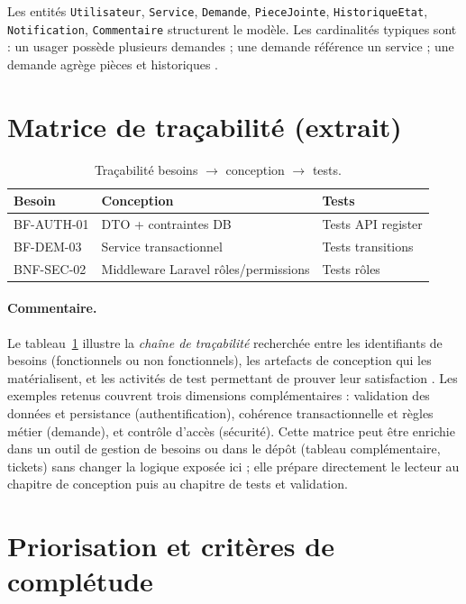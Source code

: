 Les entités \texttt{Utilisateur}, \texttt{Service}, \texttt{Demande}, \texttt{PieceJointe}, \texttt{HistoriqueEtat}, \texttt{Notification}, \texttt{Commentaire} structurent le modèle. Les cardinalités typiques sont : un usager possède plusieurs demandes ; une demande référence un service ; une demande agrège pièces et historiques \cite{date2003}.

\section{Matrice de traçabilité (extrait)}

\begin{table}[htbp]
  \centering
  \renewcommand{\arraystretch}{1.4}
  \setlength{\tabcolsep}{10pt}
  \caption{Traçabilité besoins $\rightarrow$ conception $\rightarrow$ tests.}
  \label{tab:trace}
  \begin{tabular}{|p{2.6cm}|p{5.4cm}|p{5.4cm}|}
    \hline
    \textbf{Besoin} & \textbf{Conception} & \textbf{Tests} \\
    \hline
    BF-AUTH-01 & DTO + contraintes DB & Tests API register \\
    \hline
    BF-DEM-03 & Service transactionnel & Tests transitions \\
    \hline
    BNF-SEC-02 & Middleware Laravel rôles/permissions & Tests rôles \\
    \hline
  \end{tabular}
\end{table}

\paragraph{Commentaire.}
Le tableau~\ref{tab:trace} illustre la \emph{chaîne de traçabilité} recherchée entre les identifiants de besoins (fonctionnels ou non fonctionnels), les artefacts de conception qui les matérialisent, et les activités de test permettant de prouver leur satisfaction \cite{ieee1012,sommerville2016}. Les exemples retenus couvrent trois dimensions complémentaires : validation des données et persistance (authentification), cohérence transactionnelle et règles métier (demande), et contrôle d'accès (sécurité). Cette matrice peut être enrichie dans un outil de gestion de besoins ou dans le dépôt (tableau complémentaire, tickets) sans changer la logique exposée ici ; elle prépare directement le lecteur au chapitre de conception puis au chapitre de tests et validation.

\section{Priorisation et critères de complétude}

